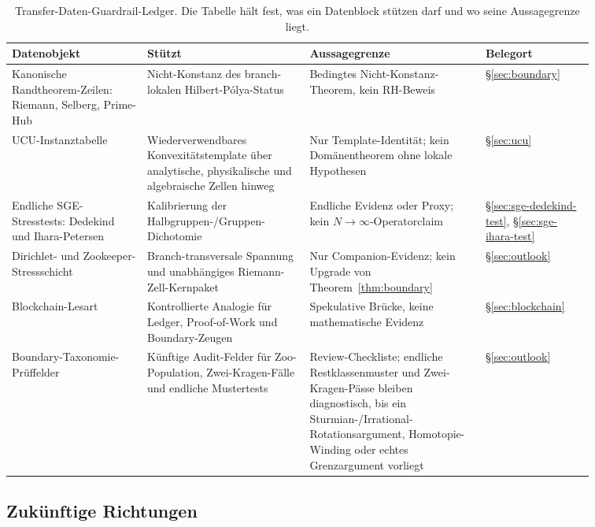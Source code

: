\documentclass[11pt]{article}
\theoremstyle{definition}
\theoremstyle{remark}
\begin{document}
\begin{table}[htbp]
\centering
\scriptsize
\renewcommand{\arraystretch}{1.13}
\setlength{\tabcolsep}{3pt}
\begin{tabular}{@{}>{\raggedright\arraybackslash}p{0.20\linewidth}
                  >{\raggedright\arraybackslash}p{0.24\linewidth}
                  >{\raggedright\arraybackslash}p{0.26\linewidth}
                  >{\raggedright\arraybackslash}p{0.16\linewidth}@{}}
\toprule
Datenobjekt & Stützt & Aussagegrenze & Belegort \\
\midrule
Kanonische Randtheorem-Zeilen:
Riemann, Selberg, Prime-Hub &
Nicht-Konstanz des branch-lokalen Hilbert-P\'olya-Status &
Bedingtes Nicht-Konstanz-Theorem, kein RH-Beweis &
\S\ref{sec:boundary} \\
UCU-Instanztabelle &
Wiederverwendbares Konvexitätstemplate über analytische, physikalische und algebraische Zellen hinweg &
Nur Template-Identität; kein Domänentheorem ohne lokale Hypothesen &
\S\ref{sec:ucu} \\
Endliche SGE-Stresstests:
Dedekind und Ihara-Petersen &
Kalibrierung der Halbgruppen-/Gruppen-Dichotomie &
Endliche Evidenz oder Proxy; kein $N\to\infty$-Operatorclaim &
\S\ref{sec:sge-dedekind-test}, \S\ref{sec:sge-ihara-test} \\
Dirichlet- und Zookeeper-Stressschicht &
Branch-transversale Spannung und unabhängiges Riemann-Zell-Kernpaket &
Nur Companion-Evidenz; kein Upgrade von Theorem~\ref{thm:boundary} &
\S\ref{sec:outlook} \\
Blockchain-Lesart &
Kontrollierte Analogie für Ledger, Proof-of-Work und Boundary-Zeugen &
Spekulative Brücke, keine mathematische Evidenz &
\S\ref{sec:blockchain} \\
Boundary-Taxonomie-Prüffelder &
Künftige Audit-Felder für Zoo-Population, Zwei-Kragen-Fälle und endliche Mustertests &
Review-Checkliste; endliche Restklassenmuster und Zwei-Kragen-Pässe bleiben
diagnostisch, bis ein Sturmian-/Irrational-Rotationsargument, Homotopie-Winding oder
echtes Grenzargument vorliegt &
\S\ref{sec:outlook} \\
\bottomrule
\end{tabular}
\caption{Transfer-Daten-Guardrail-Ledger. Die Tabelle hält fest, was
ein Datenblock stützen darf und wo seine Aussagegrenze liegt.}
\label{tab:transfer-data-ledger}
\end{table}

\subsection{Zukünftige Richtungen}
\end{document}
